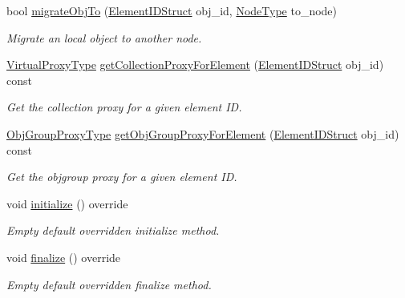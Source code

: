 \begin{DoxyCompactItemize}
bool \hyperlink{structvt_1_1vrt_1_1collection_1_1balance_1_1_node_l_b_data_a66619f696c49ce53d005f4b9ebbf12a2}{migrate\+Obj\+To} (\hyperlink{namespacevt_1_1vrt_1_1collection_1_1balance_a9f5b53fafb270212279a4757d2c4cd28}{Element\+I\+D\+Struct} obj\+\_\+id, \hyperlink{namespacevt_a866da9d0efc19c0a1ce79e9e492f47e2}{Node\+Type} to\+\_\+node)
\begin{DoxyCompactList}\small\item\em Migrate an local object to another node. \end{DoxyCompactList}\item 
\hyperlink{namespacevt_a1b417dd5d684f045bb58a0ede70045ac}{Virtual\+Proxy\+Type} \hyperlink{structvt_1_1vrt_1_1collection_1_1balance_1_1_node_l_b_data_a7f815606907a31f74428f058c220bf54}{get\+Collection\+Proxy\+For\+Element} (\hyperlink{namespacevt_1_1vrt_1_1collection_1_1balance_a9f5b53fafb270212279a4757d2c4cd28}{Element\+I\+D\+Struct} obj\+\_\+id) const
\begin{DoxyCompactList}\small\item\em Get the collection proxy for a given element ID. \end{DoxyCompactList}\item 
\hyperlink{namespacevt_ad7cae989df485fccca57f0792a880a8e}{Obj\+Group\+Proxy\+Type} \hyperlink{structvt_1_1vrt_1_1collection_1_1balance_1_1_node_l_b_data_a1f410baa1f6a5088a814fdcda87ff6d4}{get\+Obj\+Group\+Proxy\+For\+Element} (\hyperlink{namespacevt_1_1vrt_1_1collection_1_1balance_a9f5b53fafb270212279a4757d2c4cd28}{Element\+I\+D\+Struct} obj\+\_\+id) const
\begin{DoxyCompactList}\small\item\em Get the objgroup proxy for a given element ID. \end{DoxyCompactList}\item 
void \hyperlink{structvt_1_1vrt_1_1collection_1_1balance_1_1_node_l_b_data_aa489e1252abac8237d30bb0110ad36f9}{initialize} () override
\begin{DoxyCompactList}\small\item\em Empty default overridden initialize method. \end{DoxyCompactList}\item 
void \hyperlink{structvt_1_1vrt_1_1collection_1_1balance_1_1_node_l_b_data_ac62cac77080f79e73e303c42ad850155}{finalize} () override
\begin{DoxyCompactList}\small\item\em Empty default overridden finalize method. \end{DoxyCompactList}\item 

\end{DoxyCompactItemize}
